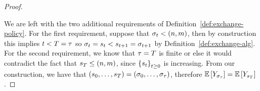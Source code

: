 \begin{proof}
\begin{enumerate}
    \end{enumerate}  

    We are left with the two additional requirements of 
    Definition~\ref{def:exchange-policy}. For the first requirement, suppose 
    that
    \(
        \sigma_{t} <
        \left(
            n, m
        \right)
    \), then by construction this implies $t<T=\tau$
    so $\sigma_{t}=s_{t}<s_{t+1}=\sigma_{t+1}$
    by Definition~\ref{def:exchange-alg}.
    For the second requirement, we know that $\tau=T$ is finite or else 
    it would contradict the fact that 
    \(
        s_{T}
        \leq
        \left(
            n,m
        \right)
    \), since $\left\{s_{t}\right\}_{t\geq 0}$ is increasing.
    From our construction, we have that 
    \(
        \left(
            s_{0},
            \ldots,
            s_{T}
        \right)
        =
        \left(
            \sigma_{0},
            \ldots,
            \sigma_{\tau}
        \right)
    \), therefore
    \(
        \mathbb{E}\left[
            Y_{
                \sigma_{\tau}
            }
        \right]
        =
        \mathbb{E}\left[
            Y_{
                s_{T}
            }
        \right]
    \).


\end{proof}
